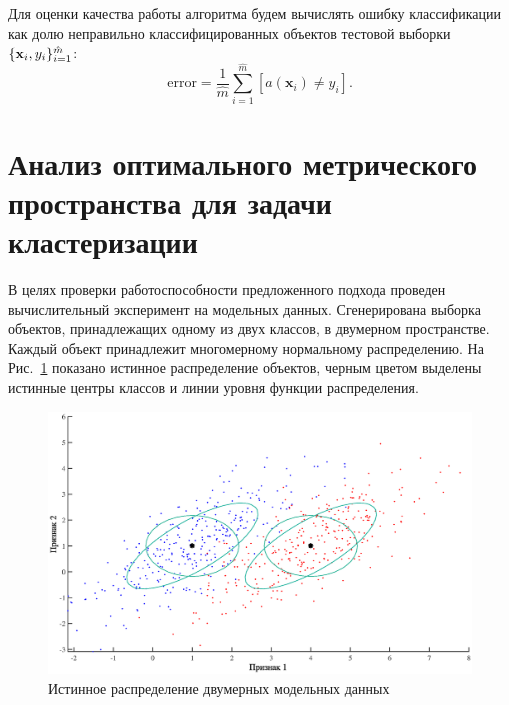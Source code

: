 Для оценки качества работы алгоритма будем вычислять ошибку классификации как долю неправильно классифицированных объектов тестовой выборки~$\{ \mathbf{x}_i, y_i \}_{i=1}^{\hat{m}}$:
\[
	\text{error} = \frac1{\hat{m}} \sum_{i = 1} ^ {\hat{m}} [a(\mathbf{x}_i) \ne y_i].
\]

\section{Анализ оптимального метрического пространства для задачи кластеризации}
\label{sec:ch5:exp_clustering}

В целях проверки работоспособности предложенного подхода проведен вычислительный эксперимент на модельных данных. Сгенерирована выборка объектов, принадлежащих одному из двух классов, в двумерном пространстве.
Каждый объект принадлежит многомерному нормальному распределению.
На Рис.~\ref{ch5:fig:true_distr} показано истинное распределение объектов, черным цветом выделены истинные центры классов и линии уровня функции распределения.

\begin{figure}[ht]
    \centering
    \includegraphics[width=\linewidth]{figs/ch5/true_distribution}
    \caption{Истинное распределение двумерных модельных данных}
    \label{ch5:fig:true_distr}
\end{figure}

